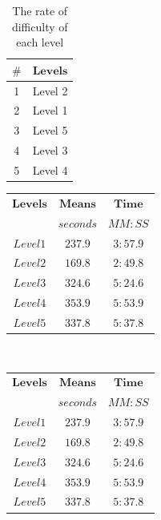 
\begin{table}[h]
\centering
\begin{tabular}[b]{|c|c|}
\hline
$\textbf{\#}$&$ \textbf{Levels}$\\
\hline
1 & Level 2\\
2 & Level 1\\
3 & Level 5\\
4 & Level 3\\
5 & Level 4\\
\hline
\end{tabular}
\caption{The rate of difficulty of each level}
\label{table:level_rates}
\end{table}
\begin{minipage}[b]{0.35\linewidth}
    \begin{tabular}[t]{|c|c|c|}
    \hline
    $\textbf{Levels}$&$ \textbf{Means}$&$\textbf{Time}$\\
                     &$ seconds $            &$MM:SS$\\
    \hline
    $Level 1$ & $237.9$ & $3:57.9$\\
    $Level 2$ & $169.8$ & $2:49.8$\\
    $Level 3$ & $324.6$ & $5:24.6$\\
    $Level 4$ & $353.9$ & $5:53.9$\\
    $Level 5$ & $337.8$ & $5:37.8$\\
    \hline
    \end{tabular} 
    \label{table:total_time}
\end{minipage}
~
\begin{minipage}[b]{0.35\linewidth}
    \begin{tabular}[t]{|c|c|c|}
    \hline
    $\textbf{Levels}$&$ \textbf{Means}$&$\textbf{Time}$\\
                     &$ seconds $            &$MM:SS$\\
    \hline
    $Level 1$ & $237.9$ & $3:57.9$\\
    $Level 2$ & $169.8$ & $2:49.8$\\
    $Level 3$ & $324.6$ & $5:24.6$\\
    $Level 4$ & $353.9$ & $5:53.9$\\
    $Level 5$ & $337.8$ & $5:37.8$\\
    \hline
    \end{tabular} 
    \label{table:experienced_time}
\end{minipage}
